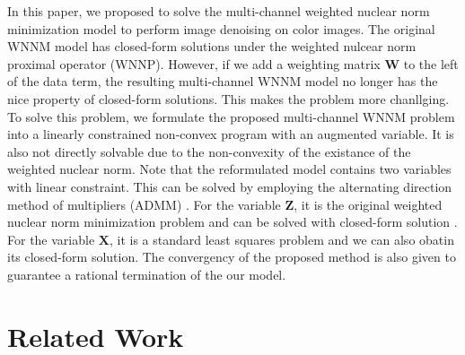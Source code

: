 \documentclass[10pt,twocolumn,letterpaper]{article}
\begin{document}
In this paper, we proposed to solve the multi-channel weighted nuclear norm minimization model to perform image denoising on color images. The original WNNM model has closed-form solutions under the weighted nulcear norm proximal operator (WNNP). However, if we add a weighting matrix $\mathbf{W}$ to the left of the data term, the resulting multi-channel WNNM model no longer has the nice property of closed-form solutions. This makes the problem more chanllging. To solve this problem, we formulate the proposed multi-channel WNNM problem into a linearly constrained non-convex program with an augmented variable. It is also not directly solvable due to the non-convexity of the existance of the weighted nuclear norm. Note that the reformulated model contains two variables with linear constraint. This can be solved by employing the alternating direction method of multipliers (ADMM) \cite{admm}. For the variable $\mathbf{Z}$, it is the original weighted nuclear norm minimization problem and can be solved with closed-form solution \cite{wnnm,lugsvt}. For the variable $\mathbf{X}$, it is a standard least squares problem and we can also obatin its closed-form solution. The convergency of the proposed method is also given to guarantee a rational termination of the our model. 



\section{Related Work}
\end{document}
